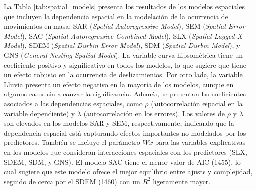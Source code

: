 \documentclass[
  manuscript=article,  
  layout=preprint,  
  year=2023,
  volume=0,
]{format}
\begin{document}
La Tabla \ref{tab:spatial_models} presenta los resultados de los modelos espaciales que incluyen la dependencia espacial en la modelación de la ocurrencia de movimientos en masa: SAR (\textit{Spatial Autoregressive Model}), SEM (\textit{Spatial Error Model}), SAC (\textit{Spatial Autoregressive Combined Model}), SLX (\textit{Spatial Lagged X Model}), SDEM (\textit{Spatial Durbin Error Model}), SDM (\textit{Spatial Durbin Model}), y GNS (\textit{General Nesting Spatial Model}). La variable curva hipsométrica tiene un coeficiente positivo y significativo en todos los modelos, lo que sugiere que tiene un efecto robusto en la ocurrencia de deslizamientos. Por otro lado, la variable Lluvia presenta un efecto negativo en la mayoría de los modelos, aunque en algunos casos sin alcanzar la significancia. Además, se presentan los coeficientes asociados a las dependencias espaciales, como $\rho$ (autocorrelación espacial en la variable dependiente) y $\lambda$ (autocorrelación en los errores). Los valores de $\rho$ y $\lambda$ son elevados en los modelos SAR y SEM, respectivamente, indicando que la dependencia espacial está capturando efectos importantes no modelados por los predictores. También se incluye el parámetro $Wx$ para las variables explicativas en los modelos que consideran interacciones espaciales con los predictores (SLX, SDEM, SDM, y GNS). El modelo SAC tiene el menor valor de AIC (1455), lo cual sugiere que este modelo ofrece el mejor equilibrio entre ajuste y complejidad, seguido de cerca por el SDEM (1460) con un $R^2$ ligeramente mayor.
\end{document}
